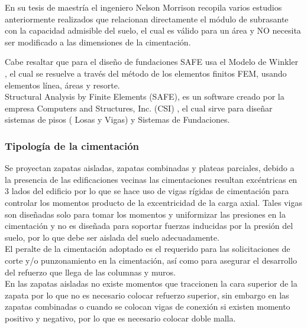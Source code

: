 \documentclass{article}%
\begin{document}
En su tesis de maestría el ingeniero Nelson Morrison recopila varios estudios anteriormente realizados que relacionan directamente el módulo de subrasante con la capacidad admisible del suelo, el cual es válido para un área y NO necesita ser modificado a las dimensiones de la cimentación.


Cabe resaltar que para el diseño de fundaciones SAFE usa el Modelo de Winkler , el cual se resuelve a través del método de los elementos finitos FEM, usando elementos línea, áreas y resorte.\\
Structural Analysis by Finite Elements (SAFE), es un software creado por la empresa Computers and Structures, Inc. (CSI) , el cual sirve para diseñar sistemas de pisos ( Losas y Vigas) y Sistemas de Fundaciones.

\subsubsection{Tipología de la cimentación}
Se proyectan zapatas aisladas, zapatas combinadas y plateas parciales, debido a la presencia de las edificaciones vecinas las cimentaciones resultan excéntricas en 3 lados del edificio por lo que se hace uso de vigas rígidas de cimentación para controlar los momentos producto de la excentricidad de la carga axial. Tales vigas son diseñadas solo para tomar los momentos y uniformizar las presiones en la cimentación y no es diseñada para soportar fuerzas inducidas por la presión del suelo, por lo que debe ser aislada del suelo adecuadamente.\\
El peralte de la cimentación adoptado es el requerido para las solicitaciones de corte y/o punzonamiento en la cimentación, así como para asegurar el desarrollo del refuerzo que llega de las columnas y muros.\\
En las zapatas aisladas no existe momentos que traccionen la cara superior de la zapata por lo que no es necesario colocar refuerzo superior, sin embargo en las zapatas combinadas o cuando se colocan vigas de conexión si existen momento positivo y negativo, por lo que es necesario colocar doble malla.
\end{document}
